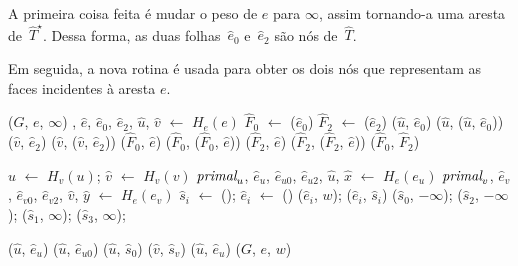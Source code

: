 A primeira coisa feita é mudar o peso de $e$ para $\infty$, assim tornando-a uma aresta de~$\hat T^\star$.
Dessa forma, as duas folhas~$\hat e_0$ e~$\hat e_2$ são nós de~$\hat T$.

Em seguida, a nova rotina \LCOLeftFace{} é usada para obter os dois nós que representam as faces incidentes à aresta $e$.


\begin{algorithm}[htb]
\caption{\MSFdelEdge($G$, $e$)}
\label{Algo:MSFdelEdge}
\begin{algorithmic}[1]
\State \MSFupdate($G$, $e$, $\infty$)\label{Algo:MSFdelEdge:linha:mudaPeso}
\State {}, $\hat e$, $\hat e_0$, $\hat e_2$, $\hat u$, $\hat v$ $\gets$ $H_e(e)$
\State $\hat F_0$ $\gets$ \LCOLeftFace($\hat e_0$)
\State $\hat F_2$ $\gets$ \LCOLeftFace($\hat e_2$)
\State
\State \LCOCycle($\hat u$, $\hat e_0$)
\State \LCOSplit($\hat u$, \LCOPredecessor($\hat u$, $\hat e_0$))
\State \LCOCycle($\hat v$, $\hat e_2$)
\State \LCOSplit($\hat v$, \LCOPredecessor($\hat v$, $\hat e_2$))
\State
\State \LCOCycle($\hat F_0$, $\hat e$)
\State \LCOSplit($\hat F_0$, \LCOPredecessor($\hat F_0$, $\hat e$))
\State \LCOCycle($\hat F_2$, $\hat e$)
\State \LCOSplit($\hat F_2$, \LCOPredecessor($\hat F_2$, $\hat e$))
\State
\State \LCOMerge($\hat F_0$, $\hat F_2$)
\end{algorithmic}
\end{algorithm}

\begin{algorithm}[htb]
\caption{\MSFaddEdge($G$, $e$, $u$, $e_u$, $v$, $e_v$, $w$)}
\label{Algo:MSFaddEdge}
\begin{algorithmic}[1]

\State $\hat u$ $\gets$ $H_v(u)$; $\hat v$ $\gets$ $H_v(v)$
\State $\textit{primal}_u$, $\hat e_u$, $\hat e_{u0}$, $\hat e_{u2}$, $\hat u$, $\hat x$ $\gets$ $H_e(e_u)$
\State $\textit{primal}_v$, $\hat e_v$, $\hat e_{v0}$, $\hat e_{v2}$, $\hat v$, $\hat y$ $\gets$ $H_e(e_v)$
\State $\hat s_i$ $\gets$ \LCOMakeNode(); $\hat e_i$ $\gets$ \LCOMakeNode()
\State  \LCOAddCost($\hat e_i$, $w$);
\State \LCOLink($\hat e_i$, $\hat s_i$)
\EndFor
\State \LCOAddCost($\hat s_0$, $-\infty$); \LCOAddCost($\hat s_2$, $-\infty$);
\State \LCOAddCost($\hat s_1$, $\infty$); \LCOAddCost($\hat s_3$, $\infty$);




\Else
{}
\State \LCOCycle($\hat u$, $\hat e_u$)
\Else
\State \LCOCycle($\hat u$, $\hat e_{u0}$)
\EndIf
\State \LCOMerge($\hat u$, $\hat s_0$)
\State \LCOMerge($\hat v$, $\hat s_v$)
\State \LCOCycle($\hat u$, $\hat e_u$)
\State \MSFupdate($G$, $e$, $w$)
\EndIf
\end{algorithmic}
\end{algorithm}



